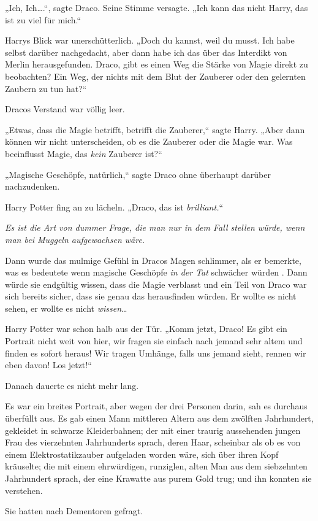{„Ich, Ich….“, sagte Draco. Seine Stimme versagte. „Ich kann das nicht Harry, das ist zu viel für mich.“

Harrys Blick war unerschütterlich. „Doch du kannst, weil du musst. Ich habe selbst darüber nachgedacht, aber dann habe ich das über das Interdikt von Merlin herausgefunden. Draco, gibt es einen Weg die Stärke von Magie direkt zu beobachten? Ein Weg, der nichts mit dem Blut der Zauberer oder den gelernten Zaubern zu tun hat?“

Dracos Verstand war völlig leer.

„Etwas, dass die Magie betrifft, betrifft die Zauberer,“ sagte Harry. „Aber dann können wir nicht unterscheiden, ob es die Zauberer oder die Magie war. Was beeinflusst Magie, das \emph{kein} Zauberer ist?“

„Magische Geschöpfe, natürlich,“ sagte Draco ohne überhaupt darüber nachzudenken.

Harry Potter fing an zu lächeln. „Draco, das ist \emph{brilliant.}“

\emph{Es ist die Art von dummer Frage, die man nur in dem Fall stellen würde, wenn man bei Muggeln aufgewachsen wäre.}

Dann wurde das mulmige Gefühl in Dracos Magen schlimmer, als er bemerkte, was es bedeutete wenn magische Geschöpfe \emph{in der Tat} schwächer würden . Dann würde sie endgültig wissen, dass die Magie verblasst und ein Teil von Draco war sich bereits sicher, dass sie genau das herausfinden würden. Er wollte es nicht sehen, er wollte es nicht \emph{wissen}…

Harry Potter war schon halb aus der Tür. „Komm jetzt, Draco! Es gibt ein Portrait nicht weit von hier, wir fragen sie einfach nach jemand sehr altem und finden es sofort heraus! Wir tragen Umhänge, falls uns jemand sieht, rennen wir eben davon! Los jetzt!“

Danach dauerte es nicht mehr lang.

Es war ein breites Portrait, aber wegen der drei Personen darin, sah es durchaus überfüllt aus. Es gab einen Mann mittleren Altern aus dem zwölften Jahrhundert, gekleidet in schwarze Kleiderbahnen; der mit einer traurig aussehenden jungen Frau des vierzehnten Jahrhunderts sprach, deren Haar, scheinbar als ob es von einem Elektrostatikzauber aufgeladen worden wäre, sich über ihren Kopf kräuselte; die mit einem ehrwürdigen, runziglen, alten Man aus dem siebzehnten Jahrhundert sprach, der eine Krawatte aus purem Gold trug; und ihn konnten sie verstehen.

Sie hatten nach Dementoren gefragt.

}
